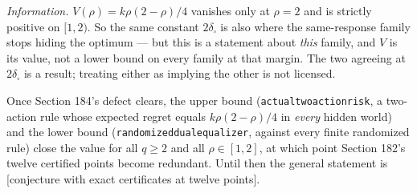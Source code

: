 \documentclass[9pt,twocolumn]{article}
\newcommand{\eclass}[1]{\textsf{[#1]}}
\renewcommand{\_}{\CIGunderscore\allowbreak}
\begin{document}
\emph{Information.} $V(\rho)=k\rho(2-\rho)/4$ vanishes only at $\rho=2$ and is strictly positive on $[1,2)$. So the same constant $2\delta_\square$ is also where the same-response family stops hiding the optimum --- but this is a statement about \emph{this} family, and $V$ is its value, not a lower bound on every family at that margin. The two agreeing at $2\delta_\square$ is a result; treating either as implying the other is not licensed.

Once Section 184's defect clears, the upper bound (\texttt{actual\_two\_action\_risk}, a two-action rule whose expected regret equals $k\rho(2-\rho)/4$ in \emph{every} hidden world) and the lower bound (\texttt{randomized\_dual\_equalizer}, against every finite randomized rule) close the value for all $q\ge2$ and all $\rho\in[1,2]$, at which point Section 182's twelve certified points become redundant. Until then the general statement is \eclass{conjecture with exact certificates at twelve points}.
\end{document}
